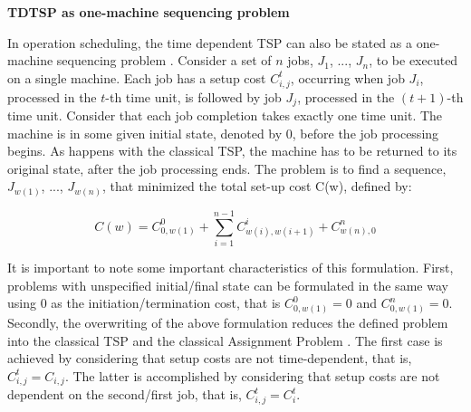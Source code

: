 \textbf{TDTSP as one-machine sequencing problem}

In operation scheduling, the time dependent TSP can also be stated as a one-machine sequencing problem \cite{tdtsp_single_machine}. Consider a set of $n$ jobs, $J_{1}$, ..., $J_{n}$, to be executed on a single machine. Each job has a setup cost $C_{i,j}^{t}$, occurring when job $J_{i}$, processed in the $t$-th time unit, is followed by job $J_{j}$, processed in the $(t+1)$-th time unit. Consider that each job completion takes exactly one time unit. The machine is in some given initial state, denoted by 0, before the job processing begins. As happens with the classical TSP, the machine has to be returned to its original state, after the job processing ends. The problem is to find a sequence, $J_{w(1)}$, ..., $J_{w(n)}$, that minimized the total set-up cost C(w), defined by:

\begin{equation}
  C(w) = C_{0, w(1)}^{0} + \sum_{i=1}^{n-1} C_{w(i), w(i+1)}^{i} +  C_{w(n), 0}^{n}
\end{equation}

It is important to note some important characteristics of this formulation. First, problems with unspecified initial/final state can be formulated in the same way using 0 as the initiation/termination cost, that is $C_{0, w(1)}^{0} = 0$ and $C_{0, w(1)}^{n} = 0$. Secondly, the overwriting of the above formulation reduces the defined problem into the classical TSP and the classical Assignment Problem \cite{assignment_problem}. The first case is achieved by considering that setup costs are not time-dependent, that is, $C_{i, j}^{t} = C_{i, j}$. The latter is accomplished by considering that setup costs are not dependent on the second/first job, that is, $C_{i, j}^{t} = C_{i}^{t}$.